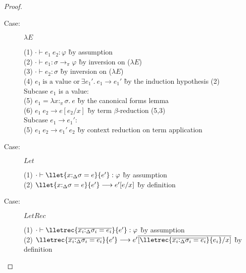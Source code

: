 \begin{proof}
\begin{description}
\item[Case:] $\lambda E$
\begin{tabbing}
(1) $\cdot \vdash e_1~e_2 : \varphi$ \` by assumption \\
(2) $\cdot \vdash e_1 : \sigma \to_\pi \varphi$ \` by inversion on ($\lambda E$) \\
(3) $\cdot \vdash e_2 : \sigma$ \` by inversion on ($\lambda E$) \\
(4) $e_1~\textrm{is a value or}~\exists e_1'.~e_1\longrightarrow e_1'$ \` by the induction hypothesis (2) \\
\textrm{Subcase $e_1$ is a value:}\\
(5) $e_1 = \lambda x{:}_\pi\sigma.~e$ \` by the canonical forms lemma \\
(6) $e_1~e_2 \longrightarrow e[e_2/x]$ \` by term $\beta$-reduction (5,3) \\
\textrm{Subcase $e_1\longrightarrow e_1'$:}\\
(5) $e_1~e_2\longrightarrow e_1'~e_2$ \` by context reduction on term application \\
\end{tabbing}

\item[Case:] $Let$
\begin{tabbing}
(1) $\cdot \vdash \llet{x{:}_\Delta\sigma = e}{e'} : \varphi$ \` by assumption \\
(2) $\llet{x{:}_\Delta\sigma = e}{e'}\longrightarrow e'[e/x]$ \` by definition\\
\end{tabbing}

\item[Case:] $LetRec$
\begin{tabbing}
(1) $\cdot \vdash \lletrec{\overline{x_i{:}_\Delta\sigma_i = e_i}}{e'} : \varphi$ \` by assumption \\
(2) $\lletrec{\overline{x_i{:}_\Delta\sigma_i = e_i}}{e'} \longrightarrow
    e'\overline{[\lletrec{\overline{x_i{:}_\Delta\sigma_i = e_i}}{e_i}/x]}$ \` by definition\\
\end{tabbing}


\end{description}
\end{proof}
